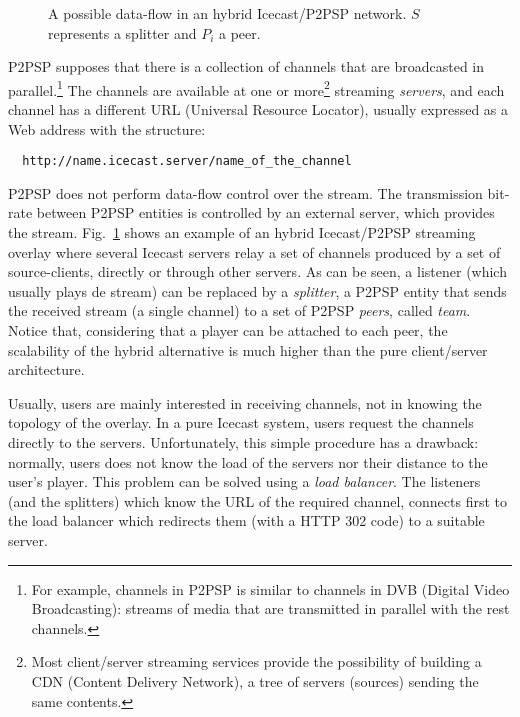 
\label{sec:STS}

\begin{figure}
   \caption{A possible data-flow in an
  hybrid Icecast/P2PSP network. $S$ represents a splitter and $P_i$ a
  peer.\label{fig:icecast-P2PSP}}
\end{figure}

P2PSP supposes that there is a collection of channels that are
broadcasted in parallel.\footnote{For example, channels in P2PSP is
  similar to channels in DVB (Digital Video Broadcasting): streams of
  media that are transmitted in parallel with the rest channels.} The
channels are available at one or more\footnote{Most client/server
  streaming services provide the possibility of building a CDN
  (Content Delivery Network), a tree of servers (sources) sending the
  same contents.} streaming \emph{servers}, and each channel has a
different URL (Universal Resource Locator), usually expressed as a
Web address with the structure:
\begin{verbatim}
  http://name.icecast.server/name_of_the_channel
\end{verbatim}

P2PSP does not perform data-flow control over the stream. The
transmission bit-rate between P2PSP entities is controlled by an
external server, which provides the
stream. Fig.~\ref{fig:icecast-P2PSP} shows an example of an hybrid
Icecast/P2PSP streaming overlay where several Icecast servers relay a
set of channels produced by a set of source-clients, directly or
through other servers. As can be seen, a listener (which usually plays
de stream) can be replaced by a \emph{splitter}, a P2PSP entity that
sends the received stream (a single channel) to a set of P2PSP
\emph{peers}, called \emph{team}. Notice that, considering that a
player can be attached to each peer, the scalability of the hybrid
alternative is much higher than the pure client/server architecture.


Usually, users are mainly interested in receiving channels, not in
knowing the topology of the overlay. In a pure Icecast system, users
request the channels directly to the servers. Unfortunately, this
simple procedure has a drawback: normally, users does not know the
load of the servers nor their distance to the user's player. This
problem can be solved using a \emph{load balancer}. The listeners (and
the splitters) which know the URL of the required channel, connects
first to the load balancer which redirects them (with a HTTP 302 code)
to a suitable server.

